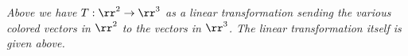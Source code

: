 \begin{center}
\emph{Above we have $T: \rr^2 \to \rr^3$ as a linear transformation 
sending the various colored vectors in $\rr^2$ to the vectors in $\rr^3$.
The linear transformation itself is given above.
}
\end{center}